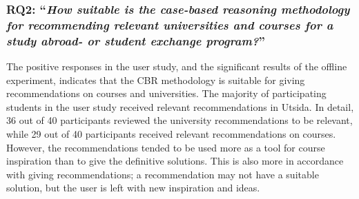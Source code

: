 \subsubsection{RQ2: \enquote{\textit{How suitable is the case-based reasoning methodology for recommending relevant universities and courses for a study abroad- or student exchange program?}}}

The positive responses in the user study, and the significant results of the offline experiment, indicates that the CBR methodology is suitable for giving recommendations on courses and universities. The majority of participating students in the user study received relevant recommendations in Utsida. In detail, 36 out of 40 participants reviewed the university recommendations to be relevant, while 29 out of 40 participants received relevant recommendations on courses. However, the recommendations tended to be used more as a tool for course inspiration than to give the definitive solutions. This is also more in accordance with giving recommendations; a recommendation may not have a suitable solution, but the user is left with new inspiration and ideas. 


